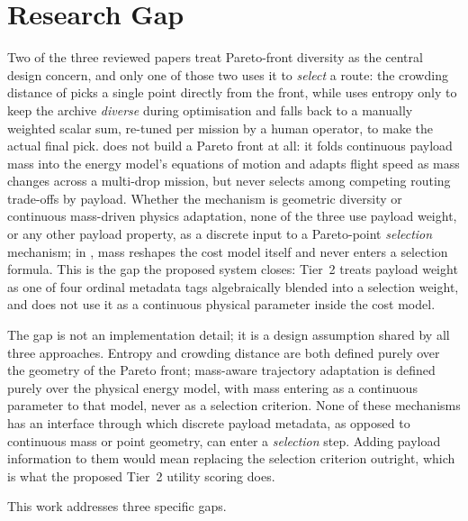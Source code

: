 \documentclass{ssnreview}
\begin{document}
\section{Research Gap}\label{sec:gap}

Two of the three reviewed papers treat Pareto-front diversity as the central design
concern, and only one of those two uses it to \emph{select} a route: the crowding
distance of \cite{r3} picks a single point directly from the front, while \cite{r1} uses
entropy only to keep the archive \emph{diverse} during optimisation and falls back to a
manually weighted scalar sum, re-tuned per mission by a human operator, to make the
actual final pick. \cite{r10} does not build a Pareto front at all: it folds continuous
payload mass into the energy model's equations of motion and adapts flight speed as mass
changes across a multi-drop mission, but never selects among competing routing
trade-offs by payload. Whether the mechanism is geometric diversity or continuous
mass-driven physics adaptation, none of the three use payload weight, or any other
payload property, as a discrete input to a Pareto-point \emph{selection} mechanism; in
\cite{r10}, mass reshapes the cost model itself and never enters a selection formula.
This is the gap the proposed system closes: Tier~2 treats payload weight as one of four
ordinal metadata tags algebraically blended into a selection weight, and does not use it
as a continuous physical parameter inside the cost model.

The gap is not an implementation detail; it is a design assumption shared by all three
approaches. Entropy and crowding distance are both defined purely over the
geometry of the Pareto front; mass-aware trajectory adaptation is defined purely over the
physical energy model, with mass entering as a continuous parameter to that model, never
as a selection criterion. None of these mechanisms has an interface through which
discrete payload metadata, as opposed to continuous mass or point geometry, can enter a
\emph{selection} step. Adding payload information to them would mean replacing the
selection criterion outright, which is what the proposed Tier~2 utility scoring does.

This work addresses three specific gaps.
\end{document}
